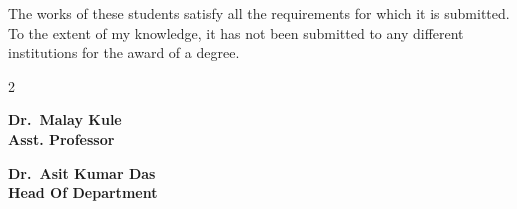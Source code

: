 \documentclass[a4paper]{article}
\begin{document}
\begin{titlepage}
    The works of these students satisfy all the requirements for which it is submitted.
    To the extent of my knowledge, it has not been submitted to any different institutions for
    the award of a degree.

    \vspace{5cm}
    \begin{multicols}{2}
        \begin{center}
            \textbf{Dr.\ Malay Kule\\Asst. Professor}\hspace{5cm}
        \end{center}
        \begin{center}
            \textbf{Dr.\ Asit Kumar Das\\Head Of Department}
        \end{center}
        \vspace{0.5cm}
    \end{multicols}
    \vfill
\end{titlepage}

\pagebreak
\newpage
\end{document}
